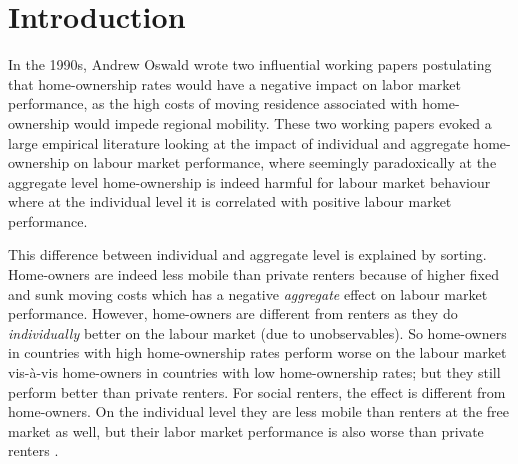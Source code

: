 \documentclass[fleqn,10pt]{SelfArx} %
\affiliation{\textsuperscript{1}\textit{Department of Spatial Economics, Vrije Universiteit Amsterdam, Amsterdam, The Netherlands}} %
\affiliation{*\textbf{Corresponding author}: \Letter{} t.de.graaff@vu.n; \Mundus{} \href{thomasdegraaff.nl}{thomasdegraaff.nl}} %
\begin{document}
	
	\flushbottom %
	\maketitle %
	\thispagestyle{empty} %
	
	
	\section{Introduction} %

        In the 1990s, Andrew Oswald wrote two influential working papers
        \citep{oswald1996conjecture, oswald1999housing} postulating
        that home-ownership rates would have a negative impact on labor
        market performance, as the high costs of moving residence
        associated with home-ownership would impede regional
        mobility. These two working papers evoked a large empirical
        literature \citep[see, e.g., ][]{munch2006homeowners,
          munch2008home, de2013european} looking at the impact of
        individual and aggregate home-ownership on labour market
        performance, where seemingly paradoxically at the aggregate
        level home-ownership is indeed harmful for labour market
        behaviour where at the individual level it is correlated with
        positive labour market performance.
        
        This difference between individual and aggregate level is explained by
        sorting. Home-owners are indeed less mobile than private renters
        because of higher fixed and sunk moving costs which has a
        negative \emph{aggregate} effect on labour market
        performance. However, home-owners are different from renters
        as they do \emph{individually} better on the labour market (due to
        unobservables). So home-owners in countries with high home-ownership rates perform worse on the labour market vis-\`a-vis home-owners in countries with low home-ownership rates; but they still perform better than private renters. For social renters, the effect is different from home-owners. On the individual level they are less mobile than renters at the free market as well, but their labor market performance is also worse than private renters \citep{hughes1981council, de2009homeownership}.
        
\end{document}
